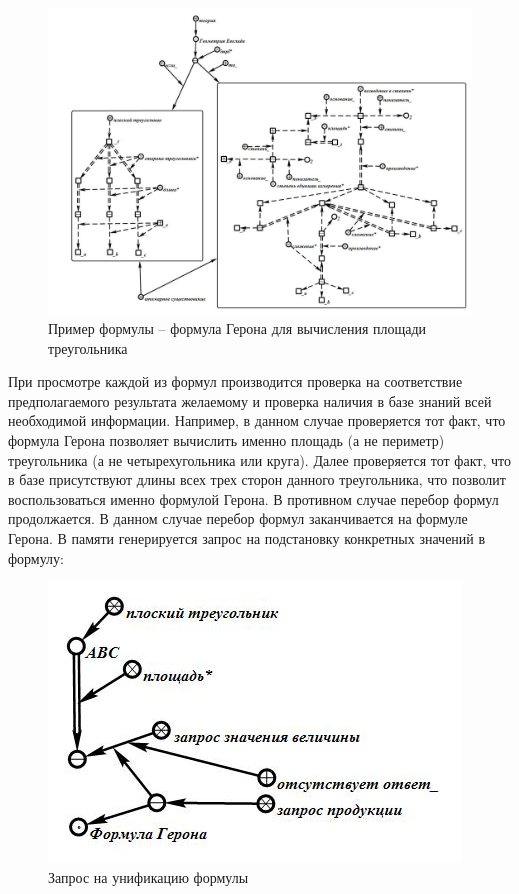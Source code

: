 \begin{figure}[H]
	\includegraphics[width=1\linewidth]{images/part7/chapter_learning_systems/step4.jpg}
	\caption{Пример формулы -- формула Герона для вычисления площади треугольника}
	\label{fig:step4}
\end{figure}

При просмотре каждой из формул производится проверка на соответствие предполагаемого результата желаемому и проверка наличия в базе знаний всей необходимой информации. Например, в данном случае проверяется тот факт, что формула Герона позволяет вычислить именно площадь (а не периметр) треугольника (а не четырехугольника или круга). Далее проверяется тот факт, что в базе присутствуют длины всех трех сторон данного треугольника, что позволит воспользоваться именно формулой Герона. В противном случае перебор формул продолжается. В данном случае перебор формул заканчивается на формуле Герона. В памяти генерируется запрос на подстановку конкретных значений в формулу:

\begin{figure}[H]
	\includegraphics[scale=0.5]{images/part7/chapter_learning_systems/step5.jpg}
	\caption{Запрос на унификацию формулы}
	\label{fig:step5}
\end{figure}

